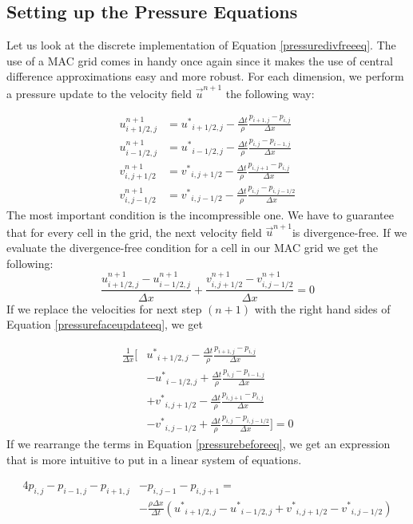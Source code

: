 \subsection{Setting up the Pressure Equations}

Let us look at the discrete implementation of Equation \ref {pressuredivfreeeq}. The use of a MAC grid comes in handy once again since it makes the use of central difference approximations easy and more robust. For each dimension, we perform a pressure update to the velocity field $\vec{u}^{n+1}$ the following way:

\begin{equation}
\begin{split}
u^{n+1}_{i+1/2,j} &= {u^*}_{i+1/2,j} - \frac{\Delta t }{\rho}\frac{p_{i+1,j} - p_{i,j}}{\Delta x} \\
u^{n+1}_{i-1/2,j} &= {u^*}_{i-1/2,j} - \frac{\Delta t }{\rho}\frac{p_{i,j} - p_{i-1,j}}{\Delta x} \\
v^{n+1}_{i,j+1/2} &= {v^*}_{i,j+1/2} - \frac{\Delta t }{\rho}\frac{p_{i,j+1} - p_{i,j}}{\Delta x} \\
v^{n+1}_{i,j-1/2} &= {v^*}_{i,j-1/2} - \frac{\Delta t }{\rho}\frac{p_{i,j} - p_{i,j-1/2}}{\Delta x}
\end{split}
\label{pressurefaceupdateeq}
\end{equation}
\noindent
The most important condition is the incompressible one. We have to guarantee that for every cell in the grid, the next velocity field $\vec{u}^{n+1}$is divergence-free. If we evaluate the divergence-free condition for a cell in our MAC grid we get the following:
\begin{equation}
\frac{u^{n+1}_{i+1/2,j} - u^{n+1}_{i-1/2,j}}{\Delta x} + \frac{v^{n+1}_{i,j+1/2} - v^{n+1}_{i,j-1/2}}{\Delta x} = 0
\end{equation}
\noindent
If we replace the velocities for next step $(n+1)$ with the right hand sides of Equation \ref{pressurefaceupdateeq}, we get

\begin{equation}
\begin{split}
\frac{1}{\Delta x}[ &{u^*}_{i+1/2,j} - \frac{\Delta t }{\rho}\frac{p_{i+1,j} - p_{i,j}}{\Delta x}
\\
& - {u^*}_{i-1/2,j} + \frac{\Delta t }{\rho}\frac{p_{i,j} - p_{i-1,j}}{\Delta x} \\
& + {v^*}_{i,j+1/2} - \frac{\Delta t }{\rho}\frac{p_{i,j+1} - p_{i,j}}{\Delta x} \\
& -{v^*}_{i,j-1/2} + \frac{\Delta t }{\rho}\frac{p_{i,j} - p_{i,j-1/2}}{\Delta x} ] = 0
\end{split}
\label{pressurebeforeeq}
\end{equation}
\noindent
If we rearrange the terms in Equation \ref{pressurebeforeeq}, we get an expression that is more intuitive to put in a linear system of equations.

\begin{equation}
\begin{split}
4p_{i,j} - p_{i-1,j} - p_{i+1,j} & - p_{i,j-1} - p_{i,j+1} = \\ &-\frac{\rho \Delta x}{\Delta t}({u^*}_{i+1/2,j} - {u^*}_{i-1/2,j} + {v^*}_{i,j+1/2} - {v^*}_{i,j-1/2})
\end{split}
\label{pressureeq}
\end{equation}
